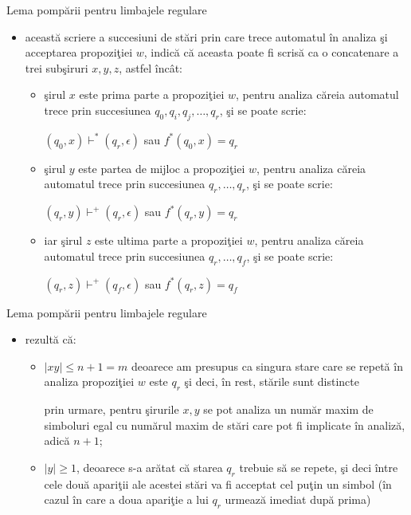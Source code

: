 \documentclass[pdf]{beamer}
\begin{document}
\begin{frame}{Lema pompării pentru limbajele regulare}
\begin{itemize}
\item
această scriere a succesiuni de stări prin care trece automatul în analiza şi acceptarea propoziţiei $ w $, indică că aceasta poate fi scrisă ca o concatenare a trei subşiruri $ x, y, z $, astfel încât:
\begin{itemize}
\item
şirul $ x $ este prima parte a propoziţiei $ w $, pentru analiza căreia automatul trece prin succesiunea $ q_0, q_i, q_j, \dots, q_r$, şi se poate scrie:

$ (q_0,x) \vdash^* (q_r, \epsilon)  $ sau $ f^*(q_0, x) = q_r $
\item
şirul $ y $ este partea de mijloc a propoziţiei $ w $, pentru analiza căreia automatul trece prin succesiunea $ q_r, \dots, q_r$,  şi se poate scrie:

$ (q_r,y) \vdash^+ (q_r, \epsilon)  $ sau $ f^*(q_r, y) = q_r $
\item
iar şirul $ z $ este ultima parte a propoziţiei $ w $, pentru analiza căreia automatul trece prin succesiunea $q_r, \dots, q_f $, şi se poate scrie:

$ (q_r,z) \vdash^+ (q_f, \epsilon)  $ sau $ f^*(q_r, z) = q_f $
\end{itemize}
\end{itemize}
\end{frame}



\begin{frame}{Lema pompării pentru limbajele regulare}
\begin{itemize}
\item
rezultă că:

\begin{itemize}
\item
$ |xy| \leq n + 1 = m $ deoarece am presupus ca singura stare care se repetă în analiza propoziţiei $ w $ este $ q_r $ şi deci, în rest, stările sunt distincte

prin urmare, pentru şirurile $ x, y $ se pot analiza un număr maxim de simboluri egal cu numărul maxim de stări care pot fi implicate în analiză, adică $ n + 1 $;
\item
$ |y| \geq 1 $, deoarece s-a arătat că starea $ q_r $ trebuie să se repete, şi deci între cele două apariţii ale acestei stări va fi acceptat cel puţin un simbol (în cazul în care a doua apariţie a lui $ q_r $ urmează imediat după prima)
\end{itemize}
\end{itemize}
\end{frame}
\end{document}
